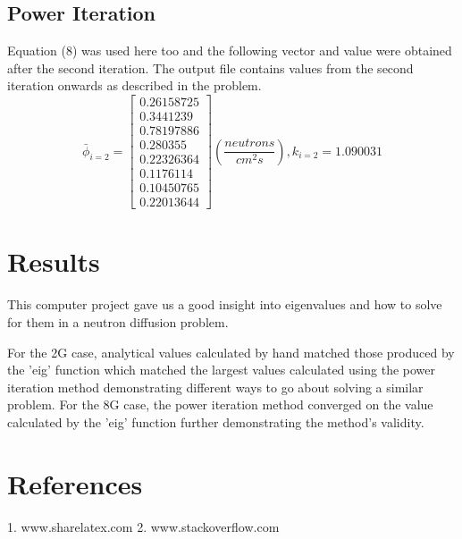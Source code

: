 \documentclass[11pt, oneside]{article}   	%
\begin{document}
\subsection{Power Iteration}
Equation (8) was used here too and the following vector and value were obtained after the second iteration. The output file contains values from the second iteration onwards as described in the problem. 
$$\bar{\phi} _{i=2} = \begin{bmatrix}
0.26158725\\ 
0.3441239\\0.78197886
 \\ 0.280355  
 \\ 0.22326364
 \\ 0.1176114 
 \\ 0.10450765
 \\ 0.22013644
\end{bmatrix}(\frac{neutrons}{cm^{2}s}), k_{i=2} = 1.090031
$$

\section{Results}
This computer project gave us a good insight into eigenvalues and how to solve for them in a neutron diffusion problem. 

For the 2G case, analytical values calculated by hand matched those produced by the 'eig' function which matched the largest values calculated using the power iteration method demonstrating different ways to go about solving a similar problem. 
For the 8G case, the power iteration method converged on the value calculated by the 'eig' function further demonstrating the method's validity.  
\section{References}

1. www.sharelatex.com
2. www.stackoverflow.com
\end{document}
